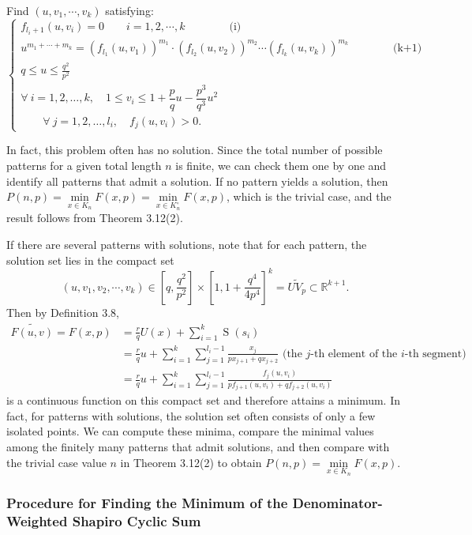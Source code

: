 \documentclass[a4paper,fleqn,numbers]{cas-sc}
\DeclareMathOperator{\Sop}{S}
\begin{document}
	Find $(u, v_1, \cdots, v_k)$ satisfying:
	\[
	\left\{
	\begin{array}{l}
		f_{l_i+1}(u, v_i) = 0 \quad \quad i=1,2,\cdots,k \qquad \qquad\text{(i)}\\
		u^{m_1+\cdots+m_k} = (f_{l_1}(u,v_1))^{m_1} \cdot (f_{l_2}(u,v_2))^{m_2} \cdots (f_{l_k}(u,v_k))^{m_k} \qquad\qquad \text{(k+1)}\\
		q\leq u\leq\frac{q^2}{p^2}\\
		\forall~i=1,2,\ldots,k, \quad 1 \leq v_i \leq 1 + \dfrac{p}{q}u - \dfrac{p^3}{q^3}u^2\\
		\qquad\forall~j=1,2,\ldots,l_i, \quad f_j(u,v_i) > 0.
	\end{array}
	\right.
	\tag{Q}
	\]
	
	In fact, this problem often has no solution. Since the total number of possible patterns for a given total length $n$ is finite, we can check them one by one and identify all patterns that admit a solution. If no pattern yields a solution, then $P(n,p)=\min\limits_{x \in K_n}F(x,p)=\min\limits_{x \in K_n^{\circ}}F(x,p)$, which is the trivial case, and the result follows from Theorem 3.12(2).
	
	If there are several patterns with solutions, note that for each pattern, the solution set lies in the compact set
	\[
	(u,v_1,v_2,\cdots,v_k)\in \left[q,\frac{q^2}{p^2}\right]\times {\left[1,1+\frac{q^4}{4p^4}\right]}^k =\widetilde{UV_p}\subset \mathbb{R}^{k+1}.
	\]
	Then by Definition 3.8,
	\begin{align*}
		\widetilde{F(u,v)}=F(x,p) &= \frac{r}{q} U(x) + \sum_{i=1}^k \Sop(s_i) \\
		&= \frac{r}{q} u + \sum_{i=1}^k \sum_{j=1}^{l_i - 1} \frac{x_j}{p x_{j+1} + q x_{j+2}} \text{ (the } j\text{-th element of the } i\text{-th segment)} \\
		&= \frac{r}{q} u + \sum_{i=1}^k \sum_{j=1}^{l_i - 1} \frac{f_j(u,v_i)}{p f_{j+1}(u,v_i) + q f_{j+2}(u,v_i)}
	\end{align*}
	is a continuous function on this compact set and therefore attains a minimum. In fact, for patterns with solutions, the solution set often consists of only a few isolated points. We can compute these minima, compare the minimal values among the finitely many patterns that admit solutions, and then compare with the trivial case value $n$ in Theorem 3.12(2) to obtain $P(n,p)=\min\limits_{x \in K_n}F(x,p)$.
	
	\subsubsection{Procedure for Finding the Minimum of the Denominator-Weighted Shapiro Cyclic Sum}
	
\end{document}
